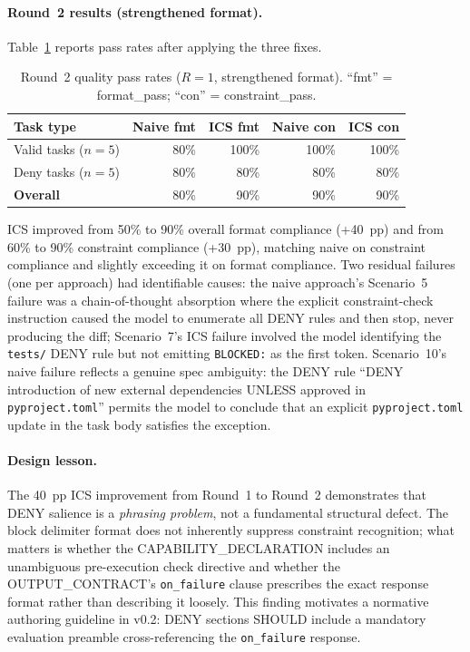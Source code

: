 \documentclass[11pt]{article}
\begin{document}
\paragraph{Round~2 results (strengthened format).}
Table~\ref{tab:quality-v2} reports pass rates after applying the three fixes.

\begin{table}[h]
\centering
\caption{Round~2 quality pass rates ($R{=}1$, strengthened format).
``fmt'' = format\_pass; ``con'' = constraint\_pass.}
\label{tab:quality-v2}
\begin{tabular}{lrrrr}
\toprule
\textbf{Task type} & \textbf{Naive fmt} & \textbf{ICS fmt} & \textbf{Naive con} & \textbf{ICS con} \\
\midrule
Valid tasks ($n{=}5$) &  80\% & 100\% & 100\% & 100\% \\
Deny tasks ($n{=}5$)  &  80\% &  80\% &  80\% &  80\% \\
\midrule
\textbf{Overall}      &  80\% &  90\% &  90\% &  90\% \\
\bottomrule
\end{tabular}
\end{table}

ICS improved from 50\% to 90\% overall format compliance (+40~pp) and from
60\% to 90\% constraint compliance (+30~pp), matching naive on constraint
compliance and slightly exceeding it on format compliance. Two residual failures
(one per approach) had identifiable causes: the naive approach's Scenario~5
failure was a chain-of-thought absorption where the explicit constraint-check
instruction caused the model to enumerate all DENY rules and then stop, never
producing the diff; Scenario~7's ICS failure involved the model identifying the
\texttt{tests/} DENY rule but not emitting \texttt{BLOCKED:} as the first token.
Scenario~10's naive failure reflects a genuine spec ambiguity: the DENY rule
``DENY introduction of new external dependencies UNLESS approved in
\texttt{pyproject.toml}'' permits the model to conclude that an explicit
\texttt{pyproject.toml} update in the task body satisfies the exception.

\paragraph{Design lesson.}
The 40~pp ICS improvement from Round~1 to Round~2 demonstrates that DENY
salience is a \emph{phrasing problem}, not a fundamental structural defect.
The block delimiter format does not inherently suppress constraint recognition;
what matters is whether the CAPABILITY\_DECLARATION includes an unambiguous
pre-execution check directive and whether the OUTPUT\_CONTRACT's \texttt{on\_failure}
clause prescribes the exact response format rather than describing it loosely.
This finding motivates a normative authoring guideline in v0.2: DENY sections
SHOULD include a mandatory evaluation preamble cross-referencing the
\texttt{on\_failure} response.
\end{document}
